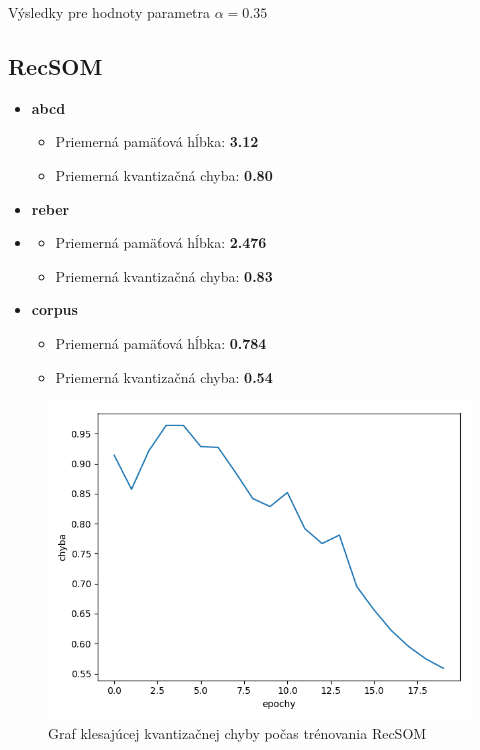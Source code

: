 Výsledky pre hodnoty parametra $\alpha = 0.35$
\subsection{RecSOM}
\begin{itemize}
    \item \textbf{abcd}
    \begin{itemize}
        \item Priemerná pamäťová hĺbka: \textbf{3.12}
        \item Priemerná kvantizačná chyba: \textbf{0.80}
    \end{itemize}
    \item \textbf{reber}
    \item \begin{itemize}
        \item Priemerná pamäťová hĺbka: \textbf{2.476}
        \item Priemerná kvantizačná chyba: \textbf{0.83}
    \end{itemize}
    \item \textbf{corpus}
    \begin{itemize}
        \item Priemerná pamäťová hĺbka: \textbf{0.784}
        \item Priemerná kvantizačná chyba: \textbf{0.54}
    \end{itemize}
\end{itemize}

\begin{figure}[H]
    \centering
    \includegraphics[width=\textwidth]{assets/r_error_top}
    \caption{Graf klesajúcej kvantizačnej chyby počas trénovania RecSOM}
    \label{kvantizacna_chyba_recsom}
\end{figure}

